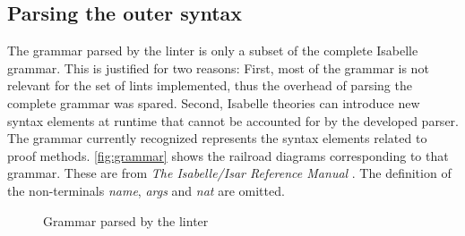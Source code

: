 \subsection{Parsing the outer syntax}\label{subsection:parsing}
The grammar parsed by the linter is only a subset of the complete 
Isabelle grammar. This is justified for two reasons: First, most
of the grammar is not relevant for the set of lints implemented, thus
the overhead of parsing the complete grammar was spared. Second, Isabelle
theories can introduce new syntax elements at runtime that cannot be
accounted for by the developed parser. The
grammar currently recognized
represents the syntax elements related to proof methods. 
\autoref{fig:grammar} shows the railroad diagrams corresponding to that
grammar. These are from \textit{The Isabelle/Isar Reference Manual} \cite{isabelle-isar-ref}. The definition of the non-terminals 
\textit{name}, \textit{args} and \textit{nat} are omitted.


\begin{figure}
\noindent{}
\noindent{}
\noindent{}
\noindent{}
\noindent{}
    \caption{Grammar parsed by the linter}\label{fig:grammar}
\end{figure}


